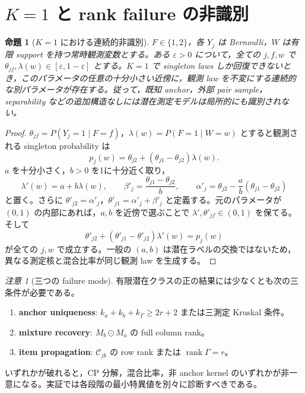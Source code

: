 \documentclass[11pt,a4paper]{ltjsarticle}
\newtheorem{proposition}{命題}[section]
\theoremstyle{remark}\newtheorem{remark}{注意}[section]
\newcommand{\rank}{\operatorname{rank}}
\newcommand{\od}{\odot}
\begin{document}
\section{$K=1$ と rank failure の非識別}

\begin{proposition}[$K=1$ における連続的非識別]\label{prop:k1}
$F\in\{1,2\}$，各 $Y_j$ は Bernoulli，$W$ は有限 support を持つ常時観測変数とする。ある $\varepsilon>0$ について，全ての $j,f,w$ で $\theta_{jf},\lambda(w)\in[\varepsilon,1-\varepsilon]$ とする。$K=1$ で singleton laws しか回復できないとき，このパラメータの任意の十分小さい近傍に，観測 law を不変にする連続的な別パラメータが存在する。従って，既知 anchor，外部 pair sample，separability などの追加構造なしには潜在測定モデルは局所的にも識別されない。
\end{proposition}

\begin{proof}
$\theta_{jf}=P(Y_j=1\mid F=f)$，$\lambda(w)=P(F=1\mid W=w)$ とすると観測される singleton probability は
\begin{equation}
p_j(w)=\theta_{j2}+(\theta_{j1}-\theta_{j2})\lambda(w).
\label{eq:k1mix}
\end{equation}
$a$ を十分小さく，$b>0$ を1に十分近く取り，
\[
\lambda'(w)=a+b\lambda(w),\qquad
\beta'_j=\frac{\theta_{j1}-\theta_{j2}}{b},\qquad
\alpha'_j=\theta_{j2}-\frac{a}{b}(\theta_{j1}-\theta_{j2})
\]
と置く。さらに $\theta'_{j2}=\alpha'_j$，$\theta'_{j1}=\alpha'_j+\beta'_j$ と定義する。元のパラメータが $(0,1)$ の内部にあれば，$a,b$ を近傍で選ぶことで $\lambda',\theta'_{jf}\in(0,1)$ を保てる。そして
\[
\theta'_{j2}+(\theta'_{j1}-\theta'_{j2})\lambda'(w)=p_j(w)
\]
が全ての $j,w$ で成立する。一般の $(a,b)$ は潜在ラベルの交換ではないため，異なる測定核と混合比率が同じ観測 law を生成する。
\end{proof}

\begin{remark}[三つの failure mode]
有限潜在クラスの正の結果には少なくとも次の三条件が必要である。
\begin{enumerate}
\item \textbf{anchor uniqueness}: $k_a+k_b+k_\Gamma\ge2r+2$ または三測定 Kruskal 条件。
\item \textbf{mixture recovery}: $M_b\od M_a$ の full column rank。
\item \textbf{item propagation}: $\mathcal C_{jk}$ の row rank または $\rank\Gamma=r$。
\end{enumerate}
いずれかが破れると，CP 分解，混合比率，非 anchor kernel のいずれかが非一意になる。実証では各段階の最小特異値を別々に診断すべきである。
\end{remark}
\end{document}
